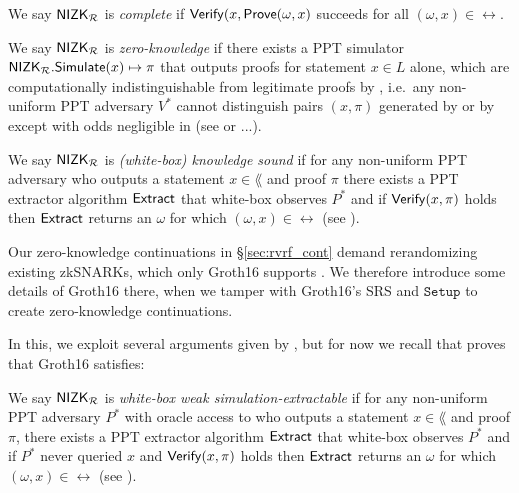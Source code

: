\begin{definition}\label{def:nizk_completeness}
We say ${\mathsf{NIZK}}_\mathcal{R}$ is {\em complete} if ${\mathsf{Verify}}(x, {\mathsf{Prove}}(\omega,x)$ succeeds for all $(\omega,x) \in \rel$.  %
\end{definition}

\def\advV{\ensuremath{V^*}\xspace} %

\begin{definition}\label{def:nizk_zero_knowledge}
We say ${\mathsf{NIZK}}_\mathcal{R}$ is {\em zero-knowledge} if
there exists a PPT simulator ${\mathsf{NIZK}}_\mathcal{R}.{\mathsf{Simulate}}(x) \mapsto \pi$
that outputs proofs for statement $x \in L$ alone, which are
computationally indistinguishable from legitimate proofs by \Prove,
i.e.\ any non-uniform PPT adversary \advV cannot distinguish pairs $(x,\pi)$
generated by \Simulate or by \Prove except with odds negligible in \secparam
(see \cite[Def. 9, \S A, pap. 29]{RandomizationGroth16} or ...).
\end{definition}

\def\advP{\ensuremath{P^*}\xspace} %

\begin{definition}\label{def:nizk_knowledge_sound}
We say ${\mathsf{NIZK}}_\mathcal{R}$ is {\em (white-box) knowledge sound} if
for any non-uniform PPT adversary \adv who outputs a statement $x \in \lang$ and proof $\pi$
there exists a PPT extractor algorithm ${\mathsf{Extract}}$ that white-box observes $\advP$ and
if ${\mathsf{Verify}}(x,\pi)$ holds then ${\mathsf{Extract}}$ returns an $\omega$ for which $(\omega,x) \in \rel$
(see \cite[Def. 7, \S A, pap. 29]{RandomizationGroth16}).
\end{definition}

Our zero-knowledge continuations in \S\ref{sec:rvrf_cont} demand
rerandomizing existing zkSNARKs, which only Groth16 supports \cite{Groth16}.
We therefore introduce some details of Groth16 \cite{Groth16} there,
when we tamper with Groth16's SRS and $\mathtt{Setup}$ to create zero-knowledge continuations. 

In this, we exploit several arguments given by \cite{RandomizationGroth16},
but for now we recall that \cite{RandomizationGroth16} proves that Groth16
satisfies: %

\begin{definition}\label{def:nizk_weak_simulation_extractable}
We say ${\mathsf{NIZK}}_\mathcal{R}$ is {\em white-box weak simulation-extractable} if
for any non-uniform PPT adversary \advP with oracle access to \Simulate
who outputs a statement $x \in \lang$ and proof $\pi$,
there exists a PPT extractor algorithm ${\mathsf{Extract}}$ that white-box observes $\advP$ and
if \advP never queried $x$ and ${\mathsf{Verify}}(x,\pi)$ holds
then ${\mathsf{Extract}}$ returns an $\omega$ for which $(\omega,x) \in \rel$
(see \cite[Def. 7, \S 2.3, pap. 29]{RandomizationGroth16}).
\end{definition}

